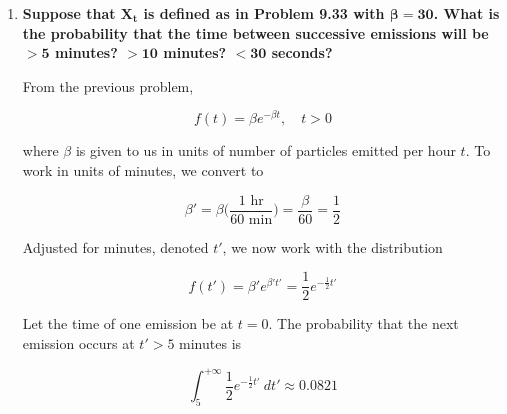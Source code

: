 \documentclass[10pt, oneside]{article}
\begin{document}
\begin{enumerate}[label=9.\arabic*]
We want to find the equivalent event in terms of $X_t$ to the event $T > t$. Namely, the event $T > t$ is the number of hours until the first emission is strictly greater than $t$. Therefore, we must have

\[ X_t = 0 \]

as the equivalent event to $T > t$, since no emissions can happen in $t < T$ hours, as we define $T$ to be the number of hours until the \textit{first} emission. Because $X_t$ follows a Poisson distribution

\[ P(X_t = k) = \frac{e^{-\beta t} (\beta t)^k}{k!} \]

it follows that

\[ P(X_t = 0) = P(T > t) = e^{-\beta t} \]

Now, the probability of the complementary event, $P(T \leq t)$, may be interpreted as the cumulative distribution function for $T$. But this is simply

\[ F(t) = P(T \leq t) = 1 - e^{-\beta t} \]

which, after differentiation with respect to $t$, yields

\[ \boxed{f(t) = \beta e^{-\beta t}, \quad t > 0} \]

\item  \begin{tcolorbox}[
  colback=Cerulean!5!white,
  colframe=Cerulean!75!black]
\textbf{Suppose that $\bm{X_t}$ is defined as in Problem 9.33 with $\bm{\beta = 30}$. What is the probability that the time between successive emissions will be $\bm{> 5}$ minutes? $\bm{> 10}$ minutes? $\bm{< 30}$ seconds?}
\end{tcolorbox}

From the previous problem,

\[ f(t) = \beta e^{-\beta t}, \quad t > 0 \]

where $\beta$ is given to us in units of number of particles emitted per hour $t$. To work in units of minutes, we convert to

\[ \beta' = \beta \bigg( \frac{1 \text{ hr}}{60 \text{ min}} \bigg) = \frac{\beta}{60} = \frac{1}{2} \]

Adjusted for minutes, denoted $t'$, we now work with the distribution

\[ f(t') = \beta' e^{\beta' t'} = \frac{1}{2} e^{-\frac{1}{2} t'} \]

Let the time of one emission be at $t = 0$. The probability that the next emission occurs at $t' > 5$ minutes is

\[ \int^{+\infty}_5 \frac{1}{2} e^{-\frac{1}{2} t'} \ dt' \approx \boxed{0.0821} \]


\end{enumerate}
\end{document}
